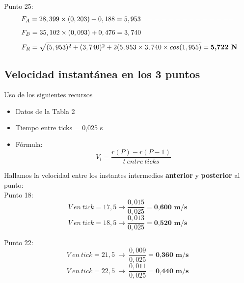 \documentclass[10pt]{article}
\begin{document}
Punto 25:
 \begin{equation*}
    F_{A} = 28,399 \times (0,203) + 0,188 = 5,953 \textcolor{Blanco}{--------------}
\end{equation*}
\begin{equation*}
    F_{B} = 35,102 \times (0,093) + 0,476 = 3,740
    \textcolor{Blanco}{--------------}
\end{equation*}  
\begin{equation*}
    \textcolor{Blanco}{..}
    F_{R} = \sqrt{(5,953)^{2} + (3,740)^{2} + 2(5,953 \times 3,740 \times cos(1,955)} = \textbf{5,722 N}
\end{equation*}
\vspace{-3mm}

\subsection{Velocidad instantánea en los 3 puntos}\vspace{2mm}

Uso de los siguientes recursos
\begin{itemize}
    \item Datos de la Tabla 2
    \item Tiempo entre ticks = 0,025 s
    \item Fórmula:
    \large{\begin{equation}
        V_{i} = \frac{r(P) - r(P-1)}{t~entre~ticks}
    \end{equation}}
\end{itemize}

\vspace{0,2cm}
Hallamos la velocidad entre los instantes intermedios \textbf{anterior} y \textbf{posterior} al punto:\\

Punto 18:
 \begin{equation*}
    V~en~tick = 17,5 \longrightarrow \frac{0,015}{0,025} = \textbf{0,600~m/s}
\end{equation*}
\vspace{0,1cm}
 \begin{equation*}
    V~en~tick = 18,5 \longrightarrow \frac{0,013}{0,025} = \textbf{0,520~m/s}
\end{equation*}

\vspace{0,25cm}
Punto 22:
 \begin{equation*}
    V~en~tick = 21,5 ~ \longrightarrow~ \frac{0,009}{0,025} = \textbf{0,360~m/s}
\end{equation*}
\vspace{0,1cm}
 \begin{equation*}
    V~en~tick = 22,5 ~ \longrightarrow ~ \frac{0,011}{0,025} = \textbf{0,440~m/s}
\end{equation*}
\end{document}
